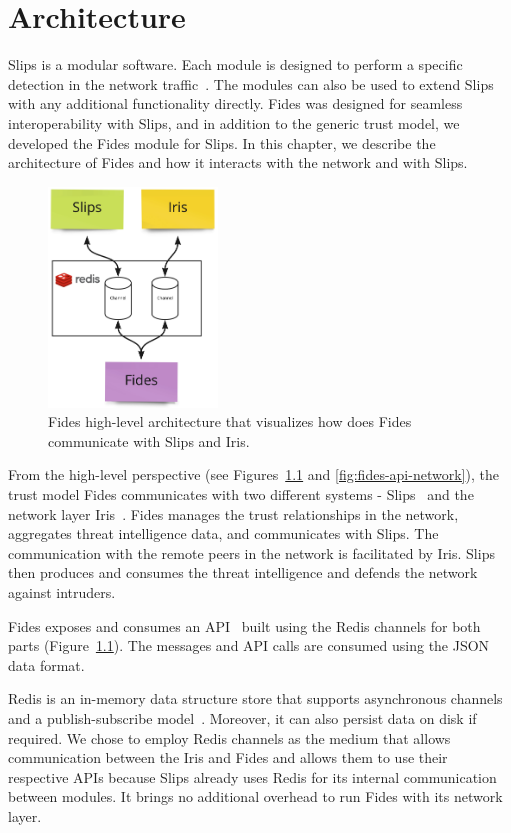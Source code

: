 \chapter{Architecture}
\label{ch:architecture}
Slips is a modular software. Each module is designed to perform a specific detection in the network traffic~\cite{slips}.
The modules can also be used to extend Slips with any additional functionality directly. 
Fides was designed for seamless interoperability with Slips, and in addition to the generic trust model, we developed the Fides module for Slips.
In this chapter, we describe the architecture of Fides and how it interacts with the network and with Slips.

\begin{figure}[ht]
    \centering
    \includegraphics[width=0.4\textwidth]{assets/redis_channels.jpeg}
    \caption{Fides high-level architecture that visualizes how does Fides communicate with Slips and Iris.}
    \label{fig:high-level-architecture}
\end{figure}

From the high-level perspective (see Figures~\ref{fig:high-level-architecture} and \ref{fig:fides-api-network}), the trust model Fides communicates with two different systems - Slips~\cite{slips} and the network layer Iris~\cite{nl}.
Fides manages the trust relationships in the network, aggregates threat intelligence data, and communicates with Slips. The communication with the remote peers in the network is facilitated by Iris. 
Slips then produces and consumes the threat intelligence and defends the network against intruders.

Fides exposes and consumes an API~\cite{api} built using the Redis channels for both parts (Figure~\ref{fig:high-level-architecture}).
The messages and API calls are consumed using the JSON~\cite{json} data format.

Redis is an in-memory data structure store that supports asynchronous channels and a publish-subscribe model~\cite{redis}. Moreover, it can also persist data on disk if required.
We chose to employ Redis channels as the medium that allows communication between the Iris and Fides and allows them to use their respective APIs because Slips already uses Redis for its internal communication between modules. It brings no additional overhead to run Fides with its network layer.



